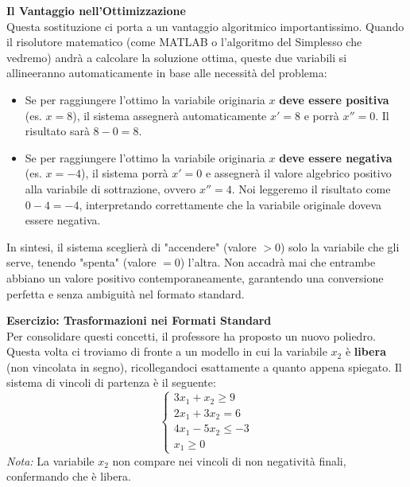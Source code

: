 \documentclass[12pt, a4paper]{article}
\begin{document}
	\textbf{Il Vantaggio nell'Ottimizzazione}\\
	Questa sostituzione ci porta a un vantaggio algoritmico importantissimo. Quando il risolutore matematico (come MATLAB o l'algoritmo del Simplesso che vedremo) andrà a calcolare la soluzione ottima, queste due variabili si allineeranno automaticamente in base alle necessità del problema:
	\begin{itemize}[label=\textcolor{titlecolor}{\Large\textbullet}, itemsep=4pt, leftmargin=1.5cm]
		\item Se per raggiungere l'ottimo la variabile originaria $x$ \textbf{deve essere positiva} (es. $x=8$), il sistema assegnerà automaticamente $x' = 8$ e porrà $x'' = 0$. Il risultato sarà $8 - 0 = 8$.
		\item Se per raggiungere l'ottimo la variabile originaria $x$ \textbf{deve essere negativa} (es. $x=-4$), il sistema porrà $x' = 0$ e assegnerà il valore algebrico positivo alla variabile di sottrazione, ovvero $x'' = 4$. Noi leggeremo il risultato come $0 - 4 = -4$, interpretando correttamente che la variabile originale doveva essere negativa.
	\end{itemize}
	In sintesi, il sistema sceglierà di "accendere" (valore $>0$) solo la variabile che gli serve, tenendo "spenta" (valore $=0$) l'altra. Non accadrà mai che entrambe abbiano un valore positivo contemporaneamente, garantendo una conversione perfetta e senza ambiguità nel formato standard.
	
	\vspace{0.6cm}
	\textbf{Esercizio: Trasformazioni nei Formati Standard}\\
	Per consolidare questi concetti, il professore ha proposto un nuovo poliedro. Questa volta ci troviamo di fronte a un modello in cui la variabile $x_2$ è \textbf{libera} (non vincolata in segno), ricollegandoci esattamente a quanto appena spiegato. Il sistema di vincoli di partenza è il seguente:
	\[
	\begin{cases}
		3x_1 + x_2 \geq 9 \\
		2x_1 + 3x_2 = 6 \\
		4x_1 - 5x_2 \leq -3 \\
		x_1 \geq 0
	\end{cases}
	\]
	\textit{Nota:} La variabile $x_2$ non compare nei vincoli di non negatività finali, confermando che è libera.
	
\end{document}
